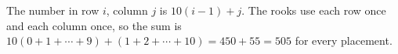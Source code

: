 The number in row $i$, column $j$ is $10(i-1)+j$. The rooks use each row once and each column once, so the sum is $10(0+1+\cdots+9)+(1+2+\cdots+10)=450+55=\boxed{505}$ for every placement.
